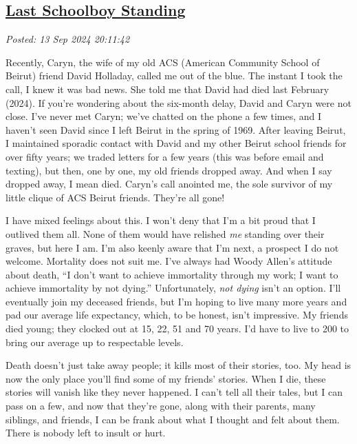 %

\subsection*{\href{http://analyzethedatanotthedrivel.org/2024/09/13/last-schoolboy-standing/}{Last Schoolboy Standing}}


\noindent\emph{Posted: 13 Sep 2024 20:11:42}
\vspace{6pt}

Recently, Caryn, the wife of my old ACS (American Community School of
Beirut) friend David Holladay, called me out of the blue. The instant I
took the call, I knew it was bad news. She told me that David had died
last February (2024). If you're wondering about the six-month delay,
David and Caryn were not close. I've never met Caryn; we've chatted on
the phone a few times, and I haven't seen David since I left Beirut in
the spring of 1969. After leaving Beirut, I maintained sporadic contact
with David and my other Beirut school friends for over fifty years; we
traded letters for a few years (this was before email and texting), but
then, one by one, my old friends dropped away. And when I say dropped
away, I mean died. Caryn's call anointed me, the sole survivor of my
little clique of ACS Beirut friends. They're all gone!

I have mixed feelings about this. I won't deny that I'm a bit proud that
I outlived them all. None of them would have relished \emph{me} standing
over their graves, but here I am. I'm also keenly aware that I'm next, a
prospect I do not welcome. Mortality does not suit me. I've always had
Woody Allen's attitude about death, ``I don't want to achieve
immortality through my work; I want to achieve immortality by not
dying.'' Unfortunately, \emph{not dying} isn't an option. I'll
eventually join my deceased friends, but I'm hoping to live many more
years and pad our average life expectancy, which, to be honest, isn't
impressive. My friends died young; they clocked out at 15, 22, 51 and 70
years. I'd have to live to 200 to bring our average up to respectable
levels.

Death doesn't just take away people; it kills most of their stories,
too. My head is now the only place you'll find some of my friends'
stories. When I die, these stories will vanish like they never happened.
I can't tell all their tales, but I can pass on a few, and now that
they're gone, along with their parents, many siblings, and friends, I
can be frank about what I thought and felt about them. There is nobody
left to insult or hurt.


